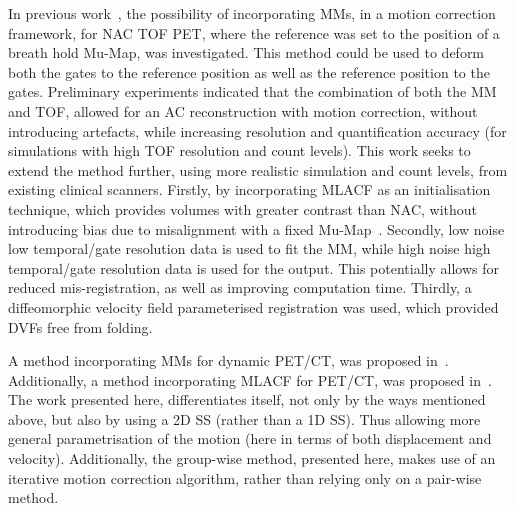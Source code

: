             In previous work~\parencite{Whitehead2019ImpactPET, Whitehead2020PET/CTFields, Whitehead2021ComparisonMap}, the possibility of incorporating \glspl{MM}, in a motion correction framework, for \gls{NAC} \gls{TOF} \gls{PET}, where the reference was set to the position of a breath hold \gls{Mu-Map}, was investigated. This method could be used to deform both the gates to the reference position as well as the reference position to the gates. Preliminary experiments indicated that the combination of both the \gls{MM} and \gls{TOF}, allowed for an \gls{AC} reconstruction with motion correction, without introducing artefacts, while increasing resolution and quantification accuracy (for simulations with high \gls{TOF} resolution and count levels). This work seeks to extend the method further, using more realistic simulation and count levels, from existing clinical scanners. Firstly, by incorporating \gls{MLACF} as an initialisation technique, which provides volumes with greater contrast than \gls{NAC}, without introducing bias due to misalignment with a fixed \gls{Mu-Map}~\parencite{Nuyts2012ML-reconstructionFactors}. Secondly, low noise low temporal/gate resolution data is used to fit the \gls{MM}, while high noise high temporal/gate resolution data is used for the output. This potentially allows for reduced mis-registration, as well as improving computation time. Thirdly, a diffeomorphic velocity field parameterised registration was used, which provided \glspl{DVF} free from folding.
            
            A method incorporating \glspl{MM} for dynamic \gls{PET}/\gls{CT}, was proposed in~\parencite{Chan2018Non-RigidPET}. Additionally, a method incorporating \gls{MLACF} for \gls{PET}/\gls{CT}, was proposed in~\parencite{Lu2018RespiratoryData}. The work presented here, differentiates itself, not only by the ways mentioned above, but also by using a \gls{2D} \gls{SS} (rather than a \gls{1D} \gls{SS}). Thus allowing more general parametrisation of the motion (here in terms of both displacement and velocity). Additionally, the group-wise method, presented here, makes use of an iterative motion correction algorithm, rather than relying only on a pair-wise method.
        
